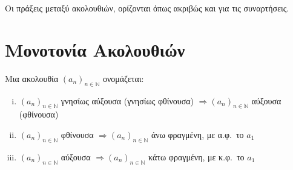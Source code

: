 \begin{mybox1}
  \begin{dfn}
    Οι πράξεις μεταξύ ακολουθιών, ορίζονται όπως ακριβώς και για τις συναρτήσεις.
  \end{dfn}
\end{mybox1}


\section{Μονοτονία Ακολουθιών}

\begin{mybox1}
  \begin{dfn}
    Μια ακολουθία $ (a_{n})_{n \in \mathbb{N}} $ ονομάζεται:
    \begin{enumerate}[i)]
  \end{enumerate}
  \end{dfn}
\end{mybox1}

\begin{rems}
\item {}
  \begin{enumerate}[i)]
    \item $ (a_{n})_{n \in \mathbb{N}} $ γνησίως αύξουσα (γνησίως φθίνουσα) $ 
      \Rightarrow (a_{n})_{n \in \mathbb{N}} $ αύξουσα (φθίνουσα) 
    \item $ (a_{n})_{n \in \mathbb{N}} $ φθίνουσα  $ 
      \Rightarrow (a_{n})_{n \in \mathbb{N}} $ άνω φραγμένη, με 
      α.φ.\ το $ a_{1} $  
    \item $ (a_{n})_{n \in \mathbb{N}} $ αύξουσα  $ 
      \Rightarrow (a_{n})_{n \in \mathbb{N}} $ κάτω φραγμένη, με 
      κ.φ.\ το $ a_{1} $  
  \end{enumerate}
\end{rems}


